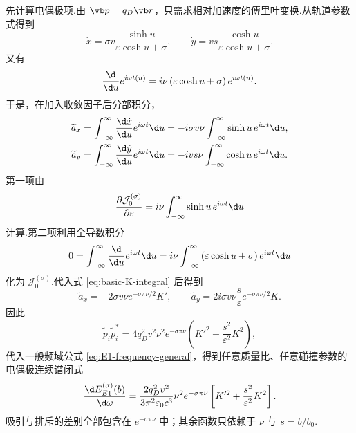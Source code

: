 先计算电偶极项.由 $\vb p=q_D\vb r$，只需求相对加速度的傅里叶变换.从轨道参数式得到
\begin{equation}
 \dot x=\sigma v\frac{\sinh u}{\varepsilon\cosh u+\sigma},
 \qquad
 \dot y=vs\frac{\cosh u}{\varepsilon\cosh u+\sigma}.
 \label{eq:hyperbolic-velocity-components-spectrum}
\end{equation}
又有
\begin{equation}
 \frac{\d}{\d u}e^{i\omega t(u)}
 =i\nu\left(\varepsilon\cosh u+\sigma\right)e^{i\omega t(u)}.
 \label{eq:hyperbolic-phase-derivative-spectrum}
\end{equation}
于是，在加入收敛因子后分部积分，
\begin{equation}
 \begin{aligned}
 \widetilde a_x
 &=\int_{-\infty}^{\infty}\frac{\d\dot x}{\d u}e^{i\omega t}\d u
 =-i\sigma v\nu\int_{-\infty}^{\infty}\sinh u\,e^{i\omega t}\d u,\\
 \widetilde a_y
 &=\int_{-\infty}^{\infty}\frac{\d\dot y}{\d u}e^{i\omega t}\d u
 =-ivs\nu\int_{-\infty}^{\infty}\cosh u\,e^{i\omega t}\d u.
 \end{aligned}
 \label{eq:acceleration-transform-before-K}
\end{equation}
第一项由
\begin{equation}
 \frac{\partial\mathcal J_0^{(\sigma)}}{\partial\varepsilon}
 =i\nu\int_{-\infty}^{\infty}\sinh u\,e^{i\omega t}\d u
\end{equation}
计算.第二项利用全导数积分
\begin{equation}
 0=\int_{-\infty}^{\infty}\frac{\d}{\d u}e^{i\omega t}\d u
 =i\nu\int_{-\infty}^{\infty}
 \left(\varepsilon\cosh u+\sigma\right)e^{i\omega t}\d u
\end{equation}
化为 $\mathcal J_0^{(\sigma)}$.代入式 \eqref{eq:basic-K-integral} 后得到
\begin{equation}
 \widetilde a_x=-2\sigma v\nu e^{-\sigma\pi\nu/2}K',
 \qquad
 \widetilde a_y=2i\sigma v\nu\frac{s}{\varepsilon}e^{-\sigma\pi\nu/2}K.
 \label{eq:dipole-acceleration-Fourier-components}
\end{equation}
因此
\begin{equation}
 \widetilde{\ddot p}_i\widetilde{\ddot p}_i^*
 =4q_D^2v^2\nu^2e^{-\sigma\pi\nu}
 \left(K'^2+\frac{s^2}{\varepsilon^2}K^2\right),
\end{equation}
代入一般频域公式 \eqref{eq:E1-frequency-general}，得到任意质量比、任意碰撞参数的电偶极连续谱闭式
\begin{equation}
 \frac{\d E_{E1}^{(\sigma)}(b)}{\d\omega}
 =\frac{2q_D^2v^2}{3\pi^2\varepsilon_0c^3}
 \nu^2e^{-\sigma\pi\nu}
 \left[
 K'^2+\frac{s^2}{\varepsilon^2}K^2
 \right].
 \label{eq:exact-E1-fixed-b-spectrum}
\end{equation}
吸引与排斥的差别全部包含在 $e^{-\sigma\pi\nu}$ 中；其余函数只依赖于 $\nu$ 与 $s=b/b_0$.

